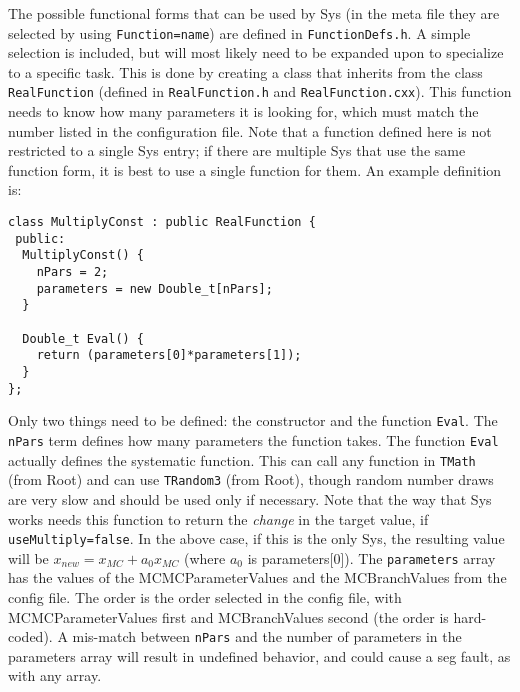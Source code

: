 
The possible functional forms that can be used by Sys (in the meta
file they are selected by using \verb|Function=name|) are defined in
\verb|FunctionDefs.h|.  A simple selection is included, but will most
likely need to be expanded upon to specialize to a specific task.
This is done by creating a class that inherits from the class
\verb|RealFunction| (defined in \verb|RealFunction.h| and
\verb|RealFunction.cxx|).  This function needs to know how many
parameters it is looking for, which must match the number listed in
the configuration file.  Note that a function defined here is not
restricted to a single Sys entry; if there are multiple Sys that use
the same function form, it is best to use a single function for them.
An example definition is:
\begin{verbatim}
class MultiplyConst : public RealFunction {
 public:
  MultiplyConst() {
    nPars = 2;
    parameters = new Double_t[nPars];
  }

  Double_t Eval() {
    return (parameters[0]*parameters[1]);
  }
};
\end{verbatim}
Only two things need to be defined: the constructor and the function
\verb|Eval|.  The \verb|nPars| term defines how many parameters the
function takes.  The function \verb|Eval| actually defines the
systematic function.  This can call any function in \verb|TMath| (from
Root) and can use \verb|TRandom3| (from Root), though random number
draws are very slow and should be used only if necessary.  Note that
the way that Sys works needs this function to return the \emph{change}
in the target value, if \verb|useMultiply=false|.  In the above case,
if this is the only Sys, the resulting value will be $x_{new} = x_{MC}
+ a_0 x_{MC}$ (where $a_0$ is parameters[0]).  The \verb|parameters|
array has the values of the MCMCParameterValues and the MCBranchValues
from the config file.  The order is the order selected in the config
file, with MCMCParameterValues first and MCBranchValues second (the
order is hard-coded).  A mis-match between \verb|nPars| and the number
of parameters in the parameters array will result in undefined
behavior, and could cause a seg fault, as with any array.

